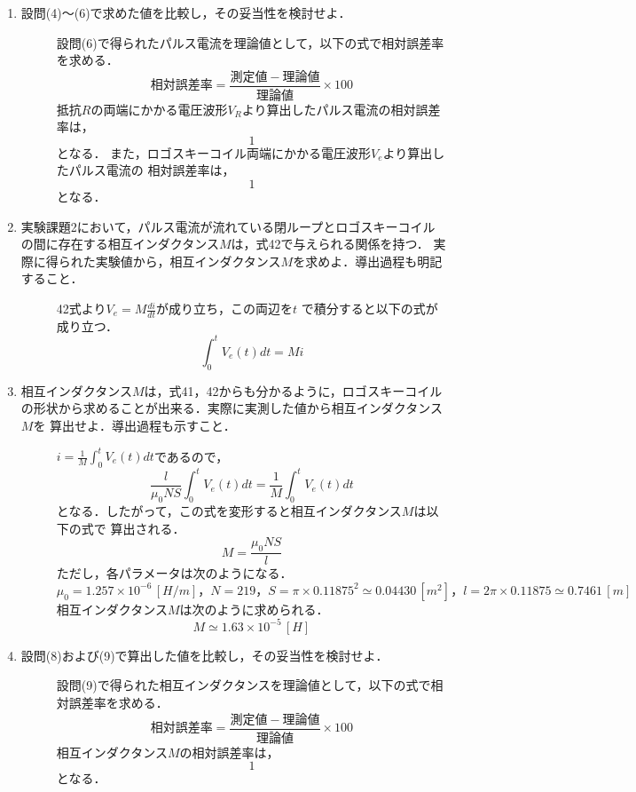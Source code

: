 \begin{enumerate}
    \item 設問(4)～(6)で求めた値を比較し，その妥当性を検討せよ．
    \begin{description}
        \item[] 設問(6)で得られたパルス電流を理論値として，以下の式で相対誤差率を求める．
        $$
        相対誤差率=\frac{測定値-理論値}{理論値}\times 100
        $$
        抵抗$R$の両端にかかる電圧波形$V_R$より算出したパルス電流の相対誤差率は，
        $$
        1
        $$
        となる．
        また，ロゴスキーコイル両端にかかる電圧波形$V_e$より算出したパルス電流の
        相対誤差率は，
        $$
        1
        $$
        となる．
    \end{description}

    \item 実験課題2において，パルス電流が流れている閉ループとロゴスキーコイル
    の間に存在する相互インダクタンス$M$は，式42で与えられる関係を持つ．
    実際に得られた実験値から，相互インダクタンス$M$を求めよ．導出過程も明記すること．
    \begin{description}
        \item[] 42式より$V_e=M\frac{di}{dt}$が成り立ち，この両辺を$t$
        で積分すると以下の式が成り立つ．
        $$
        \int_{0}^{t}V_e(t)dt=Mi
        $$
    \end{description}

    \item 相互インダクタンス$M$は，式41，42からも分かるように，ロゴスキーコイル
    の形状から求めることが出来る．実際に実測した値から相互インダクタンス$M$を
    算出せよ．導出過程も示すこと．
    \begin{description}
        \item[] $i=\frac{1}{M}\int_{0}^{t}V_e(t)dt$であるので，
        $$
        \frac{l}{\mu_0 NS}\int_{0}^{t}V_e(t)dt=\frac{1}{M}\int_{0}^{t}V_e(t)dt
        $$
        となる．したがって，この式を変形すると相互インダクタンス$M$は以下の式で
        算出される．
        $$
        M=\frac{\mu_0 NS}{l}
        $$
        ただし，各パラメータは次のようになる．
        $$
        \mu_0=1.257\times 10^{-6}\,[\si{H/m}]，N=219，S=\pi\times 0.11875^2\simeq 0.04430\,[\si{m^2}]，l=2\pi\times 0.11875\simeq 0.7461\,[\si{m}]
        $$
        相互インダクタンス$M$は次のように求められる．
        $$
        M\simeq 1.63\times 10^{-5}\,[\si{H}]
        $$
    \end{description}

    \item 設問(8)および(9)で算出した値を比較し，その妥当性を検討せよ．
    \begin{description}
        \item[] 設問(9)で得られた相互インダクタンスを理論値として，以下の式で相対誤差率を求める．
        $$
        相対誤差率=\frac{測定値-理論値}{理論値}\times 100
        $$
        相互インダクタンス$M$の相対誤差率は，
        $$
        1
        $$
        となる．
    \end{description}


\end{enumerate}
